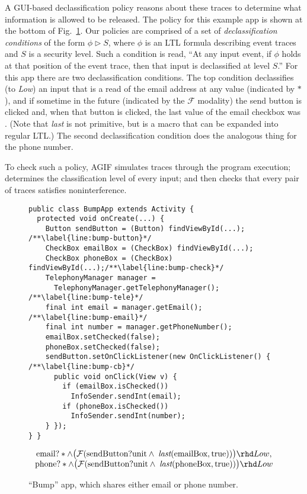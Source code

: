 \documentclass[10pt,conference,compsocconf]{IEEEtran}
\newcommand{\code}[1]{\text{\lstinline!#1!}}
\newcommand{\toolname}{AGIF\xspace}
\newcommand{\tfuture}{\mathcal{F}}
\newcommand{\tlast}[2]{\textit{last}(#1, #2)}
\begin{document}
A GUI-based declassification policy reasons about these traces to
determine what information is allowed to be released. The policy for
this example app is shown at the bottom of Fig.~\ref{fig:app-bump}.
Our policies are comprised of a set of \emph{declassification
  conditions} of the form $\phi \rhd S$, where $\phi$ is an LTL
formula describing event traces and $S$ is a security level.  Such a
condition is read, ``At any input event, if $\phi$ holds at that
position of the event trace, then that input is declassified at level
$S$.''  For this app there are two declassification conditions. The
top condition declassifies (to \emph{Low}) an input that is a
read of the email address at any value (indicated by $\ast$), and if
sometime in the future (indicated by the $\tfuture$ modality) the send
button is clicked and, when that button is clicked, the last value of
the email checkbox was \code{true}. (Note that \emph{last} is not
primitive, but is a macro that can be expanded into regular LTL.)  The
second declassification condition does the analogous thing for the
phone number.

To check such a policy, \toolname{} simulates traces through the program
execution; determines the classification level of every input; and
then checks that every pair of traces satisfies noninterference.

\begin{figure}[t]
\begin{lstlisting}[name=Ex]
public class BumpApp extends Activity {
  protected void onCreate(...) {
    Button sendButton = (Button) findViewById(...); /**\label{line:bump-button}*/
    CheckBox emailBox = (CheckBox) findViewById(...);
    CheckBox phoneBox = (CheckBox) findViewById(...);/**\label{line:bump-check}*/
    TelephonyManager manager = 
      TelephonyManager.getTelephonyManager(); /**\label{line:bump-tele}*/
    final int email = manager.getEmail(); /**\label{line:bump-email}*/
    final int number = manager.getPhoneNumber();
    emailBox.setChecked(false);
    phoneBox.setChecked(false);
    sendButton.setOnClickListener(new OnClickListener() { /**\label{line:bump-cb}*/
      public void onClick(View v) {
        if (emailBox.isChecked())
          InfoSender.sendInt(email); 
        if (phoneBox.isChecked())
          InfoSender.sendInt(number);
    } });
} }
\end{lstlisting}

\begin{displaymath}
  \begin{array}{c}
    \code{email}?\ast \wedge \big(\tfuture ( \code{sendButton?unit} \land\;
    \tlast{\code{emailBox}}{\code{true}})\big) \rhd Low, \\

    \code{phone}?\ast \wedge \big(\tfuture ( \code{sendButton?unit} \land\;
   \tlast{\code{phoneBox}}{\code{true}})\big) \rhd Low \\
  \end{array}
\end{displaymath}
\caption{``Bump'' app, which shares either email or phone number.}
\label{fig:app-bump}
\end{figure}
 
\end{document}
